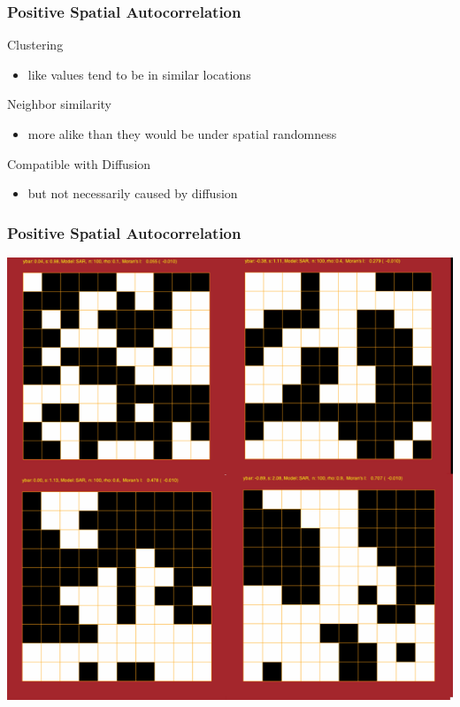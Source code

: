 \documentclass[nototal]{beamer}
\begin{document}
\begin{frame}
  \frametitle{Positive Spatial Autocorrelation}
  \begin{block}{Clustering}
    \begin{itemize}
      \item like values tend to be in similar locations
    \end{itemize}
  \end{block}
  \begin{block}{Neighbor similarity}
    \begin{itemize}
      \item more alike than they would be under spatial randomness
    \end{itemize}
  \end{block}
\begin{block}{Compatible with Diffusion}
    \begin{itemize}
      \item but not necessarily caused by diffusion
    \end{itemize}
  \end{block}
\end{frame}


  \begin{frame}
    \frametitle{Positive Spatial Autocorrelation}
    \begin{center}
      \includegraphics[width=.65\linewidth]{positive.png}
    \end{center}
  \end{frame}
\end{document}
